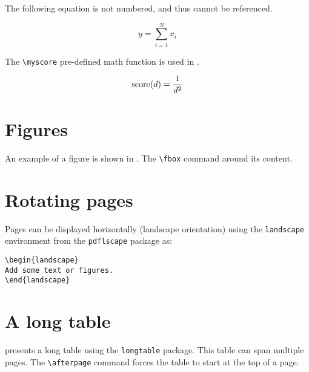 The following equation is not numbered, and thus cannot be referenced.

\begin{equation*}
y = \sum_{i=1}^{N}{x_i}
\end{equation*}

The \verb+\myscore+ pre-defined math function is used in .

\begin{equation}
\label{eq:example2}
\operatorname{score}(d) = \frac{1}{d^2}
\end{equation}


\section{Figures}
\label{c2:s:figures}

An example of a figure is shown in . The \verb+\fbox+ command  around its content.




\section{Rotating pages}
\label{c2:s:rotating-pages}

Pages can be displayed horizontally (landscape orientation) using the \verb+landscape+ environment  from the \verb+pdflscape+ package as:

\begin{verbatim}
\begin{landscape}
Add some text or figures.
\end{landscape}
\end{verbatim}


\section{A long table}
\label{c2:s:a-long-table}

 presents a long table using the \verb+longtable+ package.
This table can span multiple pages.
The \verb+\afterpage+ command forces the table to start at the top of a page.

\afterpage{}\cleardoublepage
